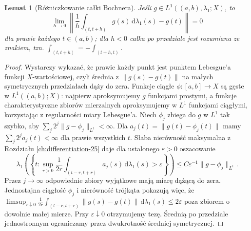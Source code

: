 \documentclass[11pt,a4paper,oneside]{book}
\numberwithin{equation}{chapter}
\theoremstyle{plain}
\newtheorem{lemat}[twierdzenie]{Lemat}
\theoremstyle{definition}
\theoremstyle{remark}
\begin{document}
\begin{lemat}[Różniczkowanie całki Bochnera]
\label{lem:bochner-differentiation-30}
Jeśli $g\in L^1((a,b),\lambda_1;X)$, to
\[
 \lim_{h\to0}\left\|
 \frac1h\int_{(t,t+h)}g(s)\,\mathrm d\lambda_1(s)-g(t)
 \right\|=0
\]
dla prawie każdego $t\in(a,b)$; dla $h<0$ całka
po przedziale jest rozumiana ze znakiem, tzn.
$\int_{(t,t+h)}=-\int_{(t+h,t)}$.
\end{lemat}
\begin{proof}
Wystarczy wykazać, że prawie każdy punkt jest
punktem Lebesgue'a funkcji $X$-wartościowej, czyli
średnia z $\|g(s)-g(t)\|$ na małych symetrycznych
przedziałach dąży do zera. Funkcje ciągłe
$\phi:[a,b]\to X$ są gęste w $L^1((a,b);X)$:
najpierw aproksymujemy $g$ funkcjami prostymi,
a funkcje charakterystyczne zbiorów mierzalnych
aproksymujemy w $L^1$ funkcjami ciągłymi,
korzystając z regularności miary Lebesgue'a.
Niech $\phi_j$ zbiega do $g$ w $L^1$ tak szybko, aby
$\sum_j2^j\|g-\phi_j\|_{L^1}<\infty$.
Dla $a_j(t)=\|g(t)-\phi_j(t)\|$ mamy
$\sum_j2^j a_j(t)<\infty$ dla prawie wszystkich $t$.
Słaba nierówność maksymalna z Rozdziału
\ref{ch:differentiation-25} daje dla ustalonego
$\varepsilon>0$ oszacowanie
\[
 \lambda_1\!\left(\left\{t:
 \sup_{r>0}\frac1{2r}\int_{(t-r,t+r)}a_j(s)
 \,\mathrm d\lambda_1(s)>\varepsilon\right\}\right)
 \le C\varepsilon^{-1}\|g-\phi_j\|_{L^1}.
\]
Przez $j\to\infty$ odpowiednie zbiory wyjątkowe
mają miarę dążącą do zera. Jednostajna ciągłość
$\phi_j$ i nierówność trójkąta pokazują więc, że
$\limsup_{r\downarrow0}\frac1{2r}\int_{(t-r,t+r)}
\|g(s)-g(t)\|\,\mathrm d\lambda_1(s)\le2\varepsilon$
poza zbiorem o dowolnie małej mierze.
Przy $\varepsilon\downarrow0$ otrzymujemy tezę.
Średnią po przedziale jednostronnym ograniczamy
przez dwukrotność średniej symetrycznej.
\end{proof}
\end{document}
